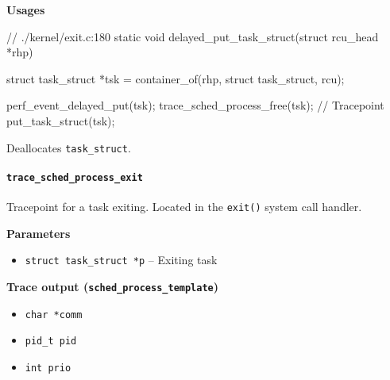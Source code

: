 \textbf{Usages}
\begin{code}
// ./kernel/exit.c:180
static void delayed_put_task_struct(struct rcu_head *rhp){
	struct task_struct *tsk = container_of(rhp, struct task_struct, rcu);

	perf_event_delayed_put(tsk);
	trace_sched_process_free(tsk); // Tracepoint
	put_task_struct(tsk);
}
\end{code}
Deallocates \verb|task_struct|.
  
\paragraph{\texttt{trace\_sched\_process\_exit}}
Tracepoint for a task exiting. Located in the \verb|exit()| system call handler.

\textbf{Parameters}
\begin{itemize}
    \item \verb|struct task_struct *p| -- Exiting task
\end{itemize}

\textbf{Trace output (\texttt{sched\_process\_template})}
\begin{itemize}
    \item \verb|char *comm|
    \item \verb|pid_t pid|
    \item \verb|int prio|
\end{itemize}

